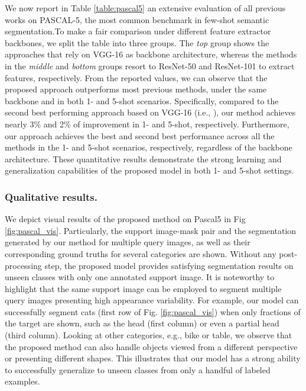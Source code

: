 \documentclass[runningheads]{llncs}
\begin{document}
We now report in Table \ref{table:pascal5} an extensive evaluation of all previous works on PASCAL-5, the most common benchmark in few-shot semantic segmentation.To make a fair comparison under different feature extractor backbones, we split the table into three groups. The \textit{top} group shows the approaches that rely on VGG-16 as backbone architecture, whereas the methods in the \textit{middle} and \textit{bottom} groups resort to ResNet-50 and ResNet-101 to extract features, respectively. From the reported values, we can observe that the proposed approach outperforms most previous methods, under the same backbone and in both 1- and 5-shot scenarios. Specifically, compared to the second best performing approach based on VGG-16 (i.e., \cite{liu2020crnet}), our method achieves nearly 3\% and 2\% of improvement in 1- and 5-shot, respectively. Furthermore, our approach achieves the best and second best performance across all the methods in the 1- and 5-shot scenarios, respectively, regardless of the backbone architecture. 
These quantitative results demonstrate the strong learning and generalization capabilities of the proposed model in both 1- and 5-shot settings. 



















\vspace{-1em}
\subsubsection{Qualitative results.}
We depict visual results of the proposed method on Pascal5 in Fig \ref{fig:pascal_vis}. Particularly, the support image-mask pair and the segmentation generated by our method for multiple query images, as well as their corresponding ground truths for several categories are shown. Without any post-processing step, the proposed model provides satisfying segmentation results on unseen classes with only one annotated support image. It is noteworthy to highlight that the same support image can be employed to segment multiple query images presenting high appearance variability. For example, our model can successfully segment cats (first row of Fig. \ref{fig:pascal_vis}) when only fractions of the target are shown, such as the head (first column) or even a partial head (third column). Looking at other categories, e.g., bike or table, we observe that the proposed method can also handle objects viewed from a different perspective or presenting different shapes. This illustrates that our model has a strong ability to successfully generalize to unseen classes from only a handful of labeled examples. 
\end{document}
